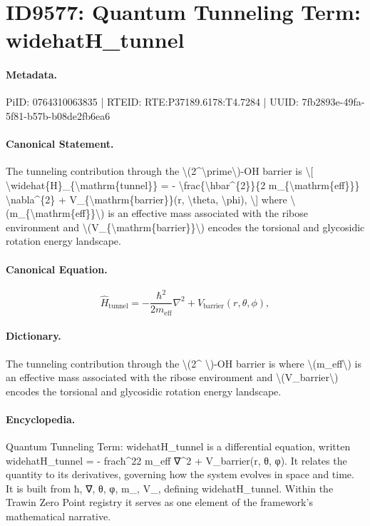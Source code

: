 \section*{ID9577: Quantum Tunneling Term: widehatH\_tunnel}
\paragraph{Metadata.}
PiID: 0764310063835 | RTEID: RTE:P37189.6178:T4.7284 | UUID: 7fb2893e-49fa-5f81-b57b-b08de2fb6ea6

\paragraph{Canonical Statement.}
The tunneling contribution through the \textbackslash{}(2\textasciicircum{}\textbackslash{}prime\textbackslash{})-OH barrier is \textbackslash{}[ \textbackslash{}widehat\{H\}\_\{\textbackslash{}mathrm\{tunnel\}\} = - \textbackslash{}frac\{\textbackslash{}hbar\textasciicircum{}\{2\}\}\{2 m\_\{\textbackslash{}mathrm\{eff\}\}\} \textbackslash{}nabla\textasciicircum{}\{2\} + V\_\{\textbackslash{}mathrm\{barrier\}\}(r, \textbackslash{}theta, \textbackslash{}phi), \textbackslash{}] where \textbackslash{}(m\_\{\textbackslash{}mathrm\{eff\}\}\textbackslash{}) is an effective mass associated with the ribose environment and \textbackslash{}(V\_\{\textbackslash{}mathrm\{barrier\}\}\textbackslash{}) encodes the torsional and glycosidic rotation energy landscape.

\paragraph{Canonical Equation.}
\[
\widehat{H}_{\mathrm{tunnel}} = - \frac{\hbar^{2}}{2 m_{\mathrm{eff}}} \nabla^{2} + V_{\mathrm{barrier}}(r, \theta, \phi),
\]

\paragraph{Dictionary.}
The tunneling contribution through the \textbackslash{}(2\textasciicircum{} \textbackslash{})-OH barrier is where \textbackslash{}(m\_eff\textbackslash{}) is an effective mass associated with the ribose environment and \textbackslash{}(V\_barrier\textbackslash{}) encodes the torsional and glycosidic rotation energy landscape.

\paragraph{Encyclopedia.}
Quantum Tunneling Term: widehatH\_tunnel is a differential equation, written widehatH\_tunnel = - fracħ\textasciicircum{}22 m\_eff ∇\textasciicircum{}2 + V\_barrier(r, θ, φ). It relates the quantity to its derivatives, governing how the system evolves in space and time. It is built from ħ, ∇, θ, φ, m\_, V\_, defining widehatH\_tunnel. Within the Trawin Zero Point registry it serves as one element of the framework's mathematical narrative.
